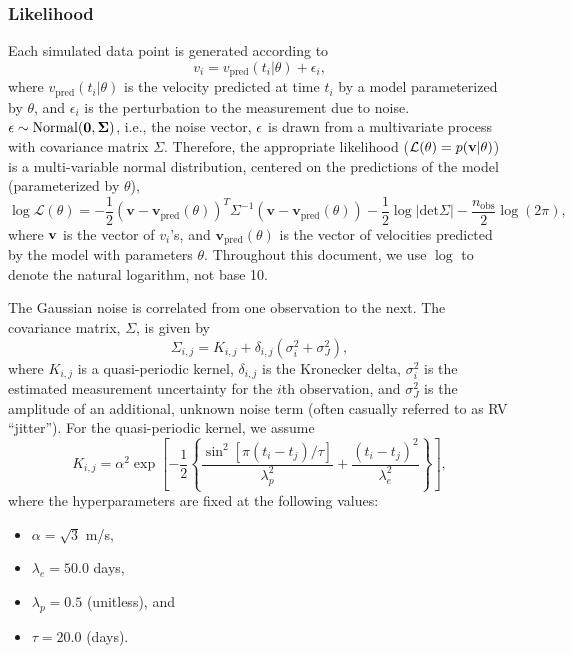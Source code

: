 \documentclass{article}
\begin{document}
\subsubsection{Likelihood}
Each simulated data point is generated according to
%
\begin{equation}
v_i = v_{\mathrm{pred}}(t_i|\theta) + \epsilon_i,
\end{equation}
%
where $v_{\mathrm{pred}}(t_i|\theta)$ is the velocity predicted at time $t_i$ by a model parameterized by $\theta$, and $\epsilon_i$ is the perturbation to the measurement due to noise.  
$\bf{\epsilon} \sim \mathrm{Normal}(0,\Sigma)$, i.e., the noise vector, $\bf{\epsilon}$ is drawn from a multivariate process with covariance matrix $\Sigma$.  
Therefore, the appropriate likelihood ($\mathcal{L}(\theta) = p(\bf{v} | \theta )$) is a multi-variable normal distribution, centered on the predictions of the model (parameterized by $\theta$),
%
\begin{equation}
\log \mathcal{L}(\theta) =  
-\frac{1}{2} (\mathbf{v}-\mathbf{v}_{\mathrm{pred}}(\theta))^{T} \Sigma^{-1} (\mathbf{v}-\mathbf{v}_{\mathrm{pred}}(\theta)) 
-\frac{1}{2} \log \left| \mathrm{det} \Sigma \right| 
-\frac{n_{\mathrm{obs}}}{2} \log (2\pi),
\end{equation}
%
where $\bf{v}$ is the vector of $v_i$'s, and $\mathbf{v}_{\mathrm{pred}}(\theta)$ is the vector of velocities predicted by the model with parameters $\theta$.
Throughout this document, we use $\log$ to denote the natural logarithm, not base 10. 

The Gaussian noise is correlated from one observation to the next.  
The covariance matrix, $\Sigma$, is given by 
\begin{equation}
\Sigma_{i,j} = K_{i,j} + \delta_{i,j} \left(\sigma_i^2 + \sigma_{J}^2 \right),
\end{equation}
where $K_{i,j}$ is a quasi-periodic kernel, $\delta_{i,j}$ is the Kronecker delta,
$\sigma_i^2$ is the estimated measurement uncertainty for the $i$th observation, and
$\sigma_{J}^2$ is the amplitude of an additional, unknown noise term (often casually referred to as RV ``jitter'').  
For the quasi-periodic kernel, we assume
\begin{equation}
K_{i,j} = \alpha^2 \exp\left[-\frac{1}{2}\left\{ \frac{\sin^2[\pi(t_i-t_j)/\tau]}{\lambda_p^2} + \frac{(t_i-t_j)^2}{\lambda_e^2}\right\}\right], 
\end{equation}
%
where the hyperparameters are fixed at the following values:
\begin{itemize}
\item $\alpha = \sqrt{3}$ m/s,
\item $\lambda_e = 50.0$ days,
\item $\lambda_p = 0.5$ (unitless), and
\item $\tau = 20.0$ (days).
\end{itemize}
\end{document}
